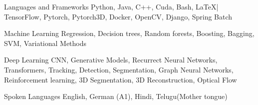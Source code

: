 
\begin{cvskills}
    \cvskill
    {Languages and Frameworks} %
    {Python, Java, C++, Cuda, Bash, \LaTeX | TensorFlow, Pytorch, Pytorch3D,
    Docker, OpenCV, Django, Spring Batch} %
    
    \cvskill
    {Machine Learning} %
    {Regression, Decision trees, Random forests, Boosting, Bagging, SVM,
    Variational Methods} %

    \cvskill
    {Deep Learning} %
    {CNN, Generative Models, Recurrect Neural Networks, Transformers, Tracking,
    Detection, Segmentation, \linebreak Graph Neural Networks, Reinforcement
    learning, 3D Segmentation, 3D Reconstruction, Optical Flow} %

    \cvskill
    {Spoken Languages} %
    {English, German (A1), Hindi, Telugu(Mother tongue)} %
    
\end{cvskills}
